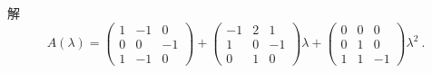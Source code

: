 解
$$
A(\lambda)=
\begin{pmatrix}
1 & -1 & 0 \\
0 & 0  & -1\\
1 & -1 & 0
\end{pmatrix}
+\begin{pmatrix}
-1 & 2 & 1 \\
1 & 0  & -1\\
0 & 1 & 0
\end{pmatrix}
\lambda
+\begin{pmatrix}
0 & 0 & 0 \\
0 & 1 & 0\\
1 & 1 & -1
\end{pmatrix}\lambda^2~.
$$

